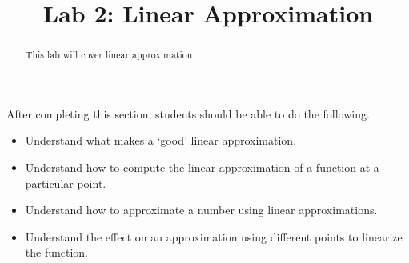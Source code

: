 \documentclass{ximera}
\title{Lab 2: Linear Approximation}
\begin{document}
\begin{abstract}
This lab will cover linear approximation.
\end{abstract}

\maketitle

\begin{sectionOutcomes}

After completing this section, students should be able to do the following.

\begin{itemize}
    \item Understand what makes a `good' linear approximation.
	\item Understand how to compute the linear approximation of a function at a particular point.
    \item Understand how to approximate a number using linear approximations.
    \item Understand the effect on an approximation using different points to linearize the function.
\end{itemize}

\end{sectionOutcomes}
\end{document}
